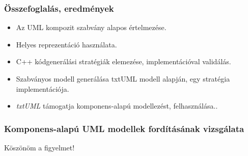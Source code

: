 \documentclass[11pt]{beamer}
\begin{document}
\begin{frame}
	\frametitle{Összefoglalás, eredmények}
	\begin{itemize}
	\item Az UML kompozit szabvány alapos értelmezése.
	\item Helyes reprezentáció használata.
	\item C++ kódgenerálási stratégiák elemezése, implementációval validálás.
	\item Szabványos modell generálása txtUML modell alapján, egy stratégia implementációja.
	\item \textit{txtUML} támogatja komponens-alapú modellezést, felhasználása..
	\end{itemize}
\end{frame}

\begin{frame}
	\frametitle{Komponens-alapú UML modellek fordításának vizsgálata}
	\begin{center}
		\Large{Köszönöm a figyelmet!}
	\end{center}
\end{frame}
\end{document}
